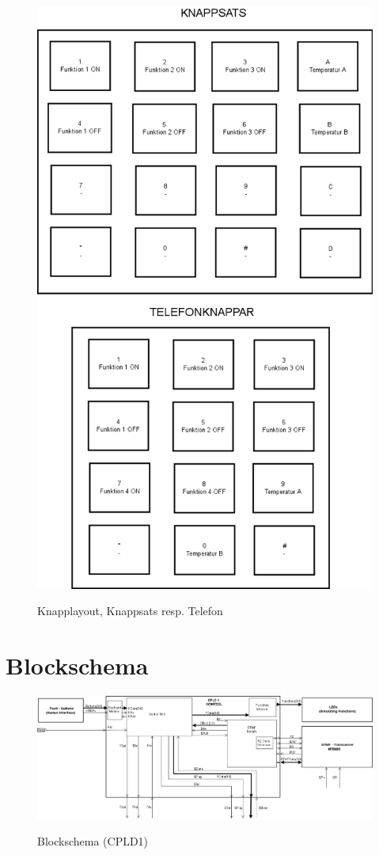 \documentclass[a4paper,11pt]{article}
\begin{document}
		\begin{figure}[ht!]
		  \centering
		      \includegraphics[scale=0.48, angle=0]{UserInterface.png}
			\label{fig:UserInterface}
		  	\caption{Knapplayout, Knappsats resp. Telefon}
		\end{figure}

	\section{Blockschema}
		\begin{figure}[ht!]
		  \centering
		      \includegraphics[scale=0.48, angle=90]{BlockDiagramCPLD1.png}
			\label{fig:BlockDiagram1}
		  	\caption{Blockschema (CPLD1)}
		\end{figure}
\end{document}
